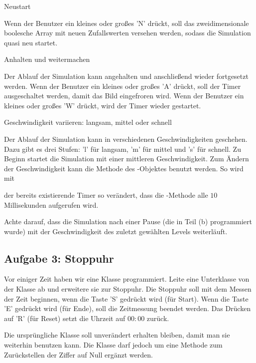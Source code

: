 \begin{compactenum}[a)]
\item Neustart

Wenn der Benutzer ein kleines oder großes 'N' drückt, soll das zweidimensionale
boolesche Array mit neuen Zufallswerten versehen werden, sodass die Simulation
quasi neu startet.

\item Anhalten und weitermachen

Der Ablauf der Simulation kann angehalten und anschließend wieder fortgesetzt
werden. Wenn der Benutzer ein kleines oder großes 'A' drückt, soll der Timer
ausgeschaltet werden, damit das Bild eingefroren wird. Wenn der Benutzer ein
kleines oder großes 'W' drückt, wird der Timer wieder gestartet.

\item Geschwindigkeit variieren: langsam, mittel oder schnell

Der Ablauf der Simulation kann in verschiedenen Geschwindigkeiten geschehen.
Dazu gibt es drei Stufen: 'l' für langsam, 'm' für mittel und 's' für schnell.
Zu Beginn startet die Simulation mit einer mittleren Geschwindigkeit. 
Zum Ändern der Geschwindigkeit kann die Methode  des
-Objektes benutzt werden. So wird mit


der bereits existierende Timer so verändert, dass die -Methode
alle $10$ Millisekunden aufgerufen wird.

Achte darauf, dass die Simulation nach einer Pause (die in Teil (b) programmiert
wurde) mit der Geschwindigkeit des zuletzt gewählten Levels weiterläuft.
\end{compactenum} 


\subsection{Aufgabe 3: Stoppuhr}

Vor einiger Zeit haben wir eine Klasse  programmiert. Leite eine
Unterklasse von der Klasse  ab und erweitere sie zur Stoppuhr. Die Stoppuhr
soll mit dem Messen der Zeit beginnen, wenn die Taste 'S' gedrückt wird (für
\glqq Start\grqq ). Wenn die Taste 'E' gedrückt wird (für \glqq Ende\grqq ),
soll die Zeitmessung beendet werden. Das Drücken auf 'R' (für \glqq Reset\grqq )
setzt die Uhrzeit auf $00:00$ zurück.

Die ursprüngliche Klasse  soll unverändert erhalten bleiben, damit
man sie weiterhin benutzen kann. Die Klasse  darf jedoch um eine
Methode zum Zurückstellen der Ziffer auf Null ergänzt werden.


